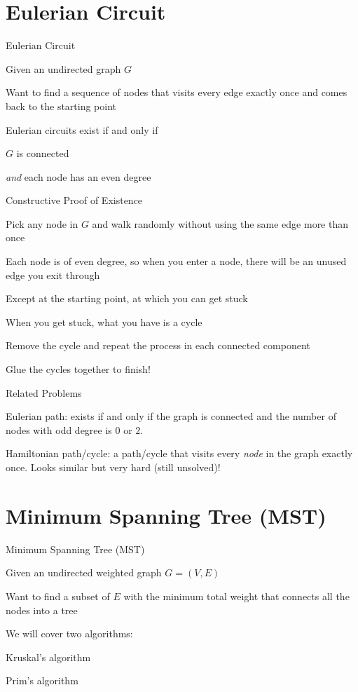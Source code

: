 \documentclass[13pt,onlymath]{beamer}
\begin{document}
\section{Eulerian Circuit}

\begin{frame}{Eulerian Circuit}
\BIT
\item Given an undirected graph $G$
\item Want to find a sequence of nodes that visits every edge exactly once and comes back to the starting point
\vfill
\item Eulerian circuits exist if and only if
\BIT
\item $G$ is connected
\item \emph{and} each node has an even degree
\EIT
\EIT
\end{frame}

\begin{frame}{Constructive Proof of Existence}
\BIT
\item Pick any node in $G$ and walk randomly without using the same edge more than once
\item Each node is of even degree, so when you enter a node, there will be an unused edge you exit through
\BIT
\item Except at the starting point, at which you can get stuck
\EIT
\item When you get stuck, what you have is a cycle
\BIT
\item Remove the cycle and repeat the process in each connected component
\item Glue the cycles together to finish!
\EIT
\EIT
\end{frame}


\begin{frame}{Related Problems}
\BIT
\item Eulerian path: exists if and only if the graph is connected and the number of nodes with odd degree is $0$ or $2$.
\vfill
\item Hamiltonian path/cycle: a path/cycle that visits every \emph{node} in the graph exactly once. Looks similar but very hard (still unsolved)!
\EIT
\end{frame}


\section{Minimum Spanning Tree (MST)}

\begin{frame}{Minimum Spanning Tree (MST)}
\BIT
\item Given an undirected weighted graph $G = (V, E)$
\item Want to find a subset of $E$ with the minimum total weight that connects all the nodes into a tree
\vfill
\item We will cover two algorithms:
\BIT
\item Kruskal's algorithm
\item Prim's algorithm
\EIT
\EIT
\end{frame}
\end{document}
